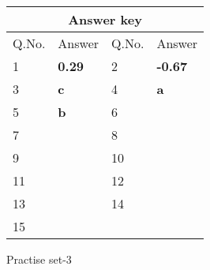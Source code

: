 \begin{table}[H]
	\centering
	\begin{tabular}{|p{1.5cm}|p{1.5cm}||p{1.5cm}|p{1.5cm}|}
		\hline
		\multicolumn{4}{|c|}{\textbf{Answer key}}\\\hline\hline
		\rowcolor{ocrel}Q.No.&Answer&Q.No.&Answer\\\hline
		1&\textbf{0.29} &2&\textbf{-0.67}\\\hline 
		3&\textbf{c} &4&\textbf{a} \\\hline
		5&\textbf{b} &6&\textbf{} \\\hline
		7&\textbf{}&8&\textbf{}\\\hline
		9&\textbf{}&10&\textbf{}\\\hline
		11&\textbf{} &12&\textbf{}\\\hline
		13&\textbf{}&14&\textbf{}\\\hline
		15&\textbf{}& &\\\hline
		
	\end{tabular}
\end{table}
\newpage
\begin{abox}
	Practise set-3
\end{abox}
